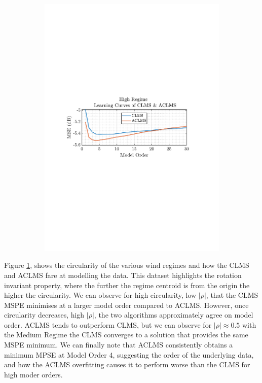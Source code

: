\documentclass[12pt]{article}
\numberwithin{equation}{section}
\begin{document}
\begin{figure}[H]
\begin{subfigure}{0.49\textwidth}
					\includegraphics[trim={2.2cm 11.2cm 3.15cm  11.2cm}, clip, width=\textwidth]{../MATLAB/figures/q3_1b_fig07.pdf} 
				\end{subfigure}			
				\captionsetup{justification=centering}
				\label{fig: 3-1b}
			\end{figure}
		
		Figure \ref{fig: 3-1b}, shows the circularity of the various wind regimes and how the CLMS and ACLMS fare at modelling the data. This dataset highlights the rotation invariant property, where the further the regime centroid is from the origin the higher the circularity. We can observe for high circularity, low $|\rho|$, that the CLMS MSPE minimises at a larger model order compared to ACLMS. However, once circularity decreases, high $|\rho|$, the two algorithms approximately agree on model order. ACLMS tends to outperform CLMS, but we can observe for  $|\rho| \approx 0.5$ with the Medium Regime the CLMS converges to a solution that provides the same MSPE minimum. We can finally note that ACLMS consistently obtains a minimum MPSE at Model Order 4, suggesting the order of the underlying data, and how the ACLMS overfitting causes it to perform worse than the CLMS for high moder orders.
	
\end{document}
